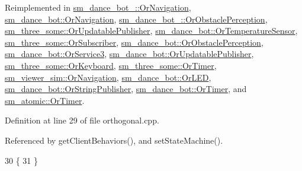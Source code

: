 Reimplemented in \hyperlink{classsm__dance__bot__2_1_1OrNavigation_acc491d801e0abacd9d152e048e77fab6}{sm\+\_\+dance\+\_\+bot\+\_\+::\+Or\+Navigation}, \hyperlink{classsm__dance__bot_1_1OrNavigation_a9f87c78f5af67024c9eda25097a135ac}{sm\+\_\+dance\+\_\+bot\+::\+Or\+Navigation}, \hyperlink{classsm__dance__bot__2_1_1OrObstaclePerception_a0c38cec76ed524ffa25c0cd305966045}{sm\+\_\+dance\+\_\+bot\+\_\+::\+Or\+Obstacle\+Perception}, \hyperlink{classsm__three__some_1_1OrUpdatablePublisher_aecda3521d565c139c75080f12e7045e0}{sm\+\_\+three\+\_\+some\+::\+Or\+Updatable\+Publisher}, \hyperlink{classsm__dance__bot_1_1OrTemperatureSensor_a2e944e459a695774dcf7fdbd5ac93b01}{sm\+\_\+dance\+\_\+bot\+::\+Or\+Temperature\+Sensor}, \hyperlink{classsm__three__some_1_1OrSubscriber_af1362388fc43c43a38d75542931e348a}{sm\+\_\+three\+\_\+some\+::\+Or\+Subscriber}, \hyperlink{classsm__dance__bot_1_1OrObstaclePerception_a4597fbab143e9bc3e350dfa730242a08}{sm\+\_\+dance\+\_\+bot\+::\+Or\+Obstacle\+Perception}, \hyperlink{classsm__dance__bot_1_1OrService3_a394d93c4a340257b8b1b941adeed8cd9}{sm\+\_\+dance\+\_\+bot\+::\+Or\+Service3}, \hyperlink{classsm__dance__bot_1_1OrUpdatablePublisher_a7de06135fd7ddea74ad9bb547fb6e79a}{sm\+\_\+dance\+\_\+bot\+::\+Or\+Updatable\+Publisher}, \hyperlink{classsm__three__some_1_1OrKeyboard_af49faa7c511ae0232ed0931ce8c85b56}{sm\+\_\+three\+\_\+some\+::\+Or\+Keyboard}, \hyperlink{classsm__three__some_1_1OrTimer_a756a41ced34733951def1d2aac8a1bb1}{sm\+\_\+three\+\_\+some\+::\+Or\+Timer}, \hyperlink{classsm__viewer__sim_1_1OrNavigation_a6f39ecbb3c1ad253c283588df860a8c4}{sm\+\_\+viewer\+\_\+sim\+::\+Or\+Navigation}, \hyperlink{classsm__dance__bot_1_1OrLED_a5073f6147253e88531b3d9a10bd1df49}{sm\+\_\+dance\+\_\+bot\+::\+Or\+L\+ED}, \hyperlink{classsm__dance__bot_1_1OrStringPublisher_a61cf6dcd0726eb1191dd0a110237968e}{sm\+\_\+dance\+\_\+bot\+::\+Or\+String\+Publisher}, \hyperlink{classsm__dance__bot_1_1OrTimer_aa0091c17ca7ff4c71badd03085272cc4}{sm\+\_\+dance\+\_\+bot\+::\+Or\+Timer}, and \hyperlink{classsm__atomic_1_1OrTimer_a509b0d9ce7c6ed9e0c291decaf6dd280}{sm\+\_\+atomic\+::\+Or\+Timer}.



Definition at line 29 of file orthogonal.\+cpp.



Referenced by get\+Client\+Behaviors(), and set\+State\+Machine().


\begin{DoxyCode}
30 \{
31 \}
\end{DoxyCode}


